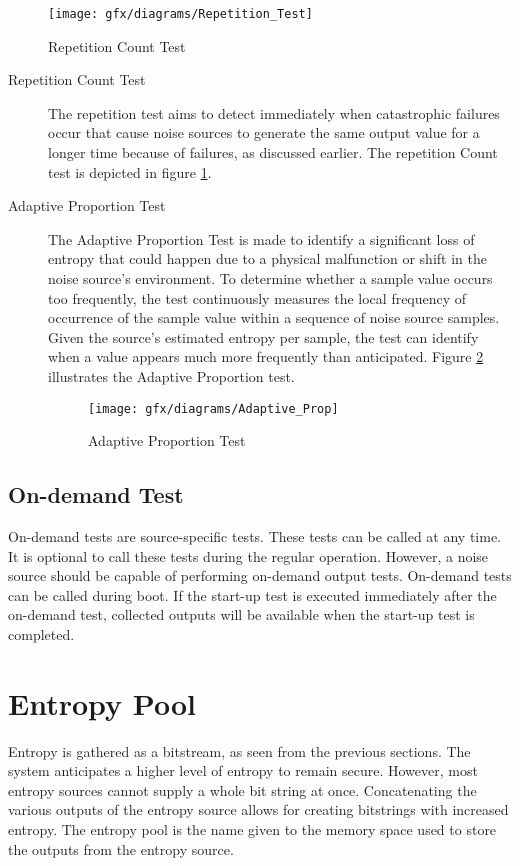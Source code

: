 \begin{figure}[!h]
	\centering
	\texttt{[image: gfx/diagrams/Repetition\_Test]}
	\caption{Repetition Count Test}
	\label{fig:2:7}
\end{figure}
\begin{description}
	\item[Repetition Count Test]The repetition test aims to detect immediately when catastrophic failures occur that cause noise sources to generate the same output value for a longer time because of failures, as discussed earlier. The repetition Count test is depicted in figure \ref{fig:2:7}.	
	
	\item[Adaptive Proportion Test] The Adaptive Proportion Test is made to identify a significant loss of entropy that could happen due to a physical malfunction or shift in the noise source’s environment. To determine whether a sample value occurs too frequently, the test continuously measures the local frequency of occurrence of the sample value within a sequence of noise source samples. Given the source’s estimated entropy per sample, the test can identify when a value appears much more frequently than anticipated. Figure \ref{fig:2:8} illustrates the Adaptive Proportion test.	
	\begin{figure}[!h]
		\centering
		\texttt{[image: gfx/diagrams/Adaptive\_Prop]}
		\caption{Adaptive Proportion Test}
		\label{fig:2:8}
	\end{figure}
\end{description}

%
%
\subsection{On-demand Test}
\label{subsec:fundamentals:HTT:ODT}
On-demand tests are source-specific tests. These tests can be called at any time. It is optional to call these tests during the regular operation. However, a noise source should be capable of performing on-demand output tests. On-demand tests can be called during boot. If the start-up test is executed immediately after the on-demand test, collected outputs will be available when the start-up test is completed.

%
%
\section{Entropy Pool}
\label{sec:fundamentals:entropypool}
Entropy is gathered as a bitstream, as seen from the previous sections. The system anticipates a higher level of entropy to remain secure. However, most entropy sources cannot supply a whole bit string at once. Concatenating the various outputs of the entropy source allows for creating bitstrings with increased entropy. The entropy pool is the name given to the memory space used to store the outputs from the entropy source.

